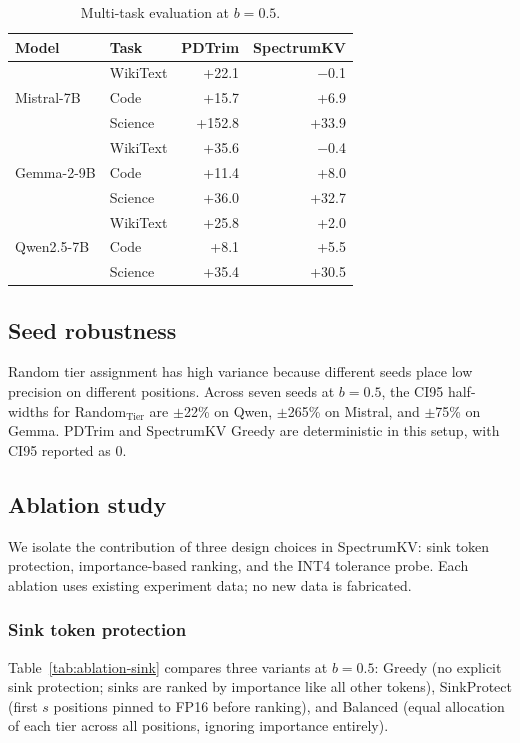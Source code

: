 \documentclass[11pt]{article}
\newcommand{\method}{SpectrumKV}
\newcommand{\budget}{b}
\newcommand{\pct}{\%}
\theoremstyle{plain}
\theoremstyle{definition}
\begin{document}
\begin{table}[h]
\centering
\caption{Multi-task evaluation at $\budget=0.5$.}
\label{tab:tasks}
\small
\begin{tabular}{llrr}
\toprule
Model & Task & PDTrim & \method{} \\
\midrule
\multirow{3}{*}{Mistral-7B} & WikiText & +22.1 & $-$0.1 \\
 & Code & +15.7 & +6.9 \\
 & Science & +152.8 & +33.9 \\
\midrule
\multirow{3}{*}{Gemma-2-9B} & WikiText & +35.6 & $-$0.4 \\
 & Code & +11.4 & +8.0 \\
 & Science & +36.0 & +32.7 \\
\midrule
\multirow{3}{*}{Qwen2.5-7B} & WikiText & +25.8 & +2.0 \\
 & Code & +8.1 & +5.5 \\
 & Science & +35.4 & +30.5 \\
\bottomrule
\end{tabular}
\end{table}

\subsection{Seed robustness}
Random tier assignment has high variance because different seeds place low precision on different positions.  Across seven seeds at $\budget=0.5$, the CI95 half-widths for Random$_{\text{Tier}}$ are $\pm$22\pct{} on Qwen, $\pm$265\pct{} on Mistral, and $\pm$75\pct{} on Gemma.  PDTrim and \method{} Greedy are deterministic in this setup, with CI95 reported as 0.

\subsection{Ablation study}
\label{sec:ablation}

We isolate the contribution of three design choices in \method{}: sink token protection, importance-based ranking, and the INT4 tolerance probe.  Each ablation uses existing experiment data; no new data is fabricated.

\subsubsection{Sink token protection}
\label{sec:ablation-sink}

Table~\ref{tab:ablation-sink} compares three variants at $\budget=0.5$: Greedy (no explicit sink protection; sinks are ranked by importance like all other tokens), SinkProtect (first $s$ positions pinned to FP16 before ranking), and Balanced (equal allocation of each tier across all positions, ignoring importance entirely).
\end{document}
